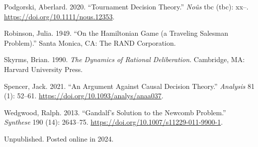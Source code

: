 \documentclass[
  11pt,
  letterpaper,
  DIV=11,
  numbers=noendperiod,
  oneside]{scrartcl}
\newlength{\cslhangindent}
\newenvironment{CSLReferences}[2] %
 {\begin{list}{}{%
  \setlength{\itemindent}{0pt}
  \setlength{\leftmargin}{0pt}
  \setlength{\parsep}{0pt}
  \ifodd #1
   \setlength{\leftmargin}{\cslhangindent}
   \setlength{\itemindent}{-1\cslhangindent}
  \fi
  \setlength{\itemsep}{#2\baselineskip}}}
 {\end{list}}
\begin{document}
\begin{CSLReferences}{1}{0}
Podgorski, Aberlard. 2020. {``Tournament Decision Theory.''}
\emph{No{û}s} tbc (tbc): xx--. \url{https://doi.org/10.1111/nous.12353}.

Robinson, Julia. 1949. {``On the Hamiltonian Game (a Traveling Salesman
Problem).''} Santa Monica, CA: The RAND Corporation.

Skyrms, Brian. 1990. \emph{The Dynamics of Rational Deliberation}.
Cambridge, MA: Harvard University Press.

Spencer, Jack. 2021. {``An Argument Against Causal Decision Theory.''}
\emph{Analysis} 81 (1): 52--61.
\url{https://doi.org/10.1093/analys/anaa037}.

Wedgwood, Ralph. 2013. {``Gandalf's Solution to the Newcomb Problem.''}
\emph{Synthese} 190 (14): 2643--75.
\url{https://doi.org/10.1007/s11229-011-9900-1}.

\end{CSLReferences}



Unpublished. Posted online in 2024.
\end{document}
